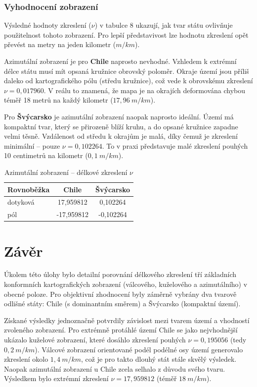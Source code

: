 \documentclass[12pt, a4paper]{article}
\begin{document}
\subsubsection{Vyhodnocení zobrazení}

Výsledné hodnoty zkreslení ($\nu$) v tabulce 8 ukazují, jak tvar státu ovlivňuje použitelnost tohoto zobrazení. Pro lepší představivost lze hodnotu zkreslení opět převést na metry na jeden kilometr ($m/km$).

Azimutální zobrazení je pro \textbf{Chile} naprosto nevhodné. Vzhledem k extrémní délce státu musí mít opsaná kružnice obrovský poloměr. Okraje území jsou příliš daleko od kartografického pólu (středu kružnice), což vede k obrovskému zkreslení $\nu = 0,017960$. V reálu to znamená, že mapa je na okrajích deformována chybou téměř 18 metrů na každý kilometr ($17,96~m/km$).

Pro \textbf{Švýcarsko} je azimutální zobrazení naopak naprosto ideální. Území má kompaktní tvar, který se přirozeně blíží kruhu, a do opsané kružnice zapadne velmi těsně. Vzdálenost od středu k okrajům je malá, díky čemuž je zkreslení minimální – pouze $\nu = 0,102264$. To v praxi představuje malé zkreslení pouhých 10 centimetrů na kilometr ($0,1~m/km$).

\begin{table}[htbp]
    \centering
    \begin{tabular}{|l|c|c|}
        \hline
        \textbf{Rovnoběžka} & \textbf{Chile} & \textbf{Švýcarsko} \\
        \hline
        dotyková & 17,959812 & 0,102264 \\
        pól & -17,959812 & -0,102264 \\
        \hline
    \end{tabular}
    \caption{Azimutální zobrazení -- délkové zkreslení $\nu$}
    \label{tab:azimut_zkresleni}
\end{table}

\section{Závěr}
Úkolem této úlohy bylo detailní porovnání délkového zkreslení tří základních konformních kartografických zobrazení (válcového, kuželového a azimutálního) v obecné poloze. Pro objektivní zhodnocení byly záměrně vybrány dva tvarově odlišné státy: Chile (s dominantním směrem) a Švýcarsko (kompaktní území).

Získané výsledky jednoznačně potvrdily závislost mezi tvarem území a vhodností zvoleného zobrazení. Pro extrémně protáhlé území Chile se jako nejvhodnější ukázalo kuželové zobrazení, které dosáhlo zkreslení pouhých $\nu = 0,195056$ (tedy $0,2~m/km$). Válcové zobrazení orientované podél podélné osy území generovalo zkreslení okolo $1,4~m/km$, což je pro takto dlouhý stát stále skvělý výsledek. Naopak azimutální zobrazení u Chile zcela selhalo z důvodu svého tvaru. Výsledkem bylo extrémní zkreslení $\nu = 17,959812$ (téměř $18~m/km$).
\end{document}
